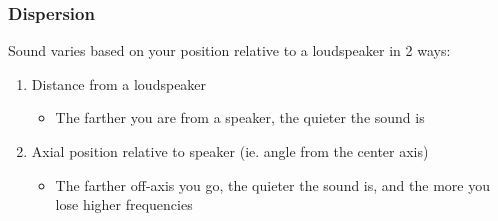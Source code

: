 \documentclass[a4paper]{article}
\begin{document}
\subsubsection{Dispersion}
Sound varies based on your position relative to a loudspeaker in 2 ways:
\begin{enumerate}
	\item Distance from a loudspeaker
		\begin{itemize}
			\item The farther you are from a speaker, the quieter
				the sound is
		\end{itemize}
	\item Axial position relative to speaker (ie. angle from the center
		axis)
		\begin{itemize}
			\item The farther off-axis you go, the quieter the
				sound is, and the more you lose higher
				frequencies
		\end{itemize}
\end{enumerate}
\end{document}
